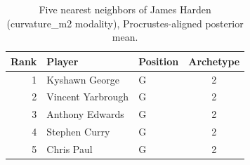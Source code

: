 \begin{table}[htbp]
  \centering\small
  \begin{tabular}{rllc}
    \toprule
    Rank & Player & Position & Archetype \\
    \midrule
    1 & Kyshawn George & G & 2 \\
    2 & Vincent Yarbrough & G & 2 \\
    3 & Anthony Edwards & G & 2 \\
    4 & Stephen Curry & G & 2 \\
    5 & Chris Paul & G & 2 \\
    \bottomrule
  \end{tabular}
  \caption{Five nearest neighbors of James Harden (curvature_m2 modality), Procrustes-aligned posterior mean.}
  \label{tab:James_Harden_neighbors_curvature_m2}
\end{table}

